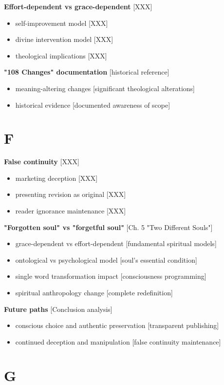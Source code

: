 \documentclass[11pt,twoside]{book}
\begin{document}
\textbf{\textbf{Effort-dependent vs grace-dependent}} {[}XXX]
\begin{itemize}
\item self-improvement model [XXX]
\item divine intervention model [XXX]
\item theological implications [XXX]
\end{itemize}

\textbf{\textbf{"108 Changes" documentation}} {[}historical reference]
\begin{itemize}
\item meaning-altering changes [significant theological alterations]
\item historical evidence [documented awareness of scope]
\end{itemize}
\section*{F}
\label{sec:org6f9d764}

\textbf{\textbf{False continuity}} {[}XXX]
\begin{itemize}
\item marketing deception [XXX]
\item presenting revision as original [XXX]
\item reader ignorance maintenance [XXX]
\end{itemize}

\textbf{\textbf{"Forgotten soul" vs "forgetful soul"}} {[}Ch. 5 "Two Different Souls"]
\begin{itemize}
\item grace-dependent vs effort-dependent [fundamental spiritual models]
\item ontological vs psychological model [soul's essential condition]
\item single word transformation impact [consciousness programming]
\item spiritual anthropology change [complete redefinition]
\end{itemize}

\textbf{\textbf{Future paths}} {[}Conclusion analysis]
\begin{itemize}
\item conscious choice and authentic preservation [transparent publishing]
\item continued deception and manipulation [false continuity maintenance]
\end{itemize}
\section*{G}
\label{sec:orga7e250e}
\end{document}
